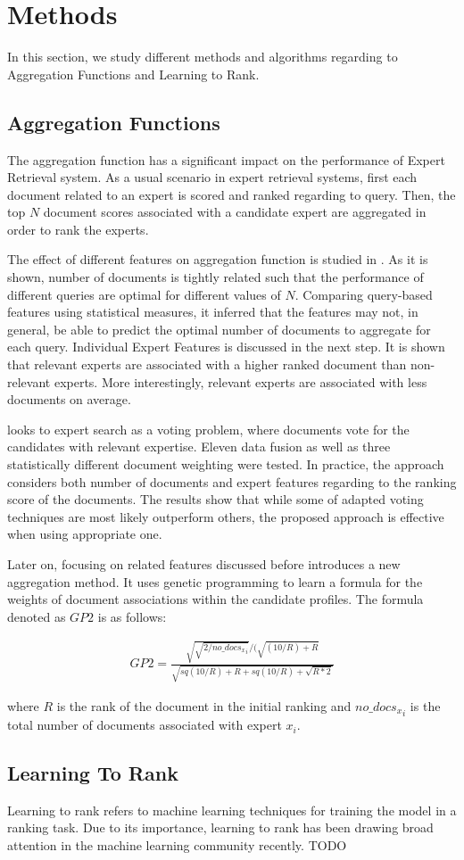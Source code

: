 \section{Methods}
\label{sec:methods}
In this section, we study different methods and algorithms regarding to Aggregation Functions and Learning to Rank.

\subsection{Aggregation Functions}
The aggregation function has a significant impact on the performance of Expert Retrieval system. As a usual scenario in expert retrieval systems, first each document related to an expert is scored and ranked regarding to query. Then, the top $N$ document scores associated with a candidate expert are aggregated in order to rank the experts. 

The effect of different features on aggregation function is studied in \citet{agg-gp2}. As it is shown, number of documents is tightly related such that the performance of different queries are optimal for different values of $N$. Comparing query-based features using statistical measures, it inferred that the features may not, in general, be able to predict the optimal number of documents to aggregate for each query. Individual Expert Features is discussed in the next step. It is shown that relevant experts are associated with a higher ranked document than non-relevant experts. More interestingly, relevant experts are associated with less documents on average.

\citet{agg-vote} looks to expert search as a voting problem, where documents vote for the candidates with relevant expertise. Eleven data fusion as well as three statistically different document weighting were tested. In practice, the approach considers both number of documents and expert features regarding to the ranking score of the documents. The results show that while some of adapted voting techniques are most likely outperform others, the proposed approach is effective when using appropriate one.

Later on, focusing on related features discussed before \citet{agg-gp2} introduces a new aggregation method. It uses genetic programming to learn a formula for the weights of document associations within the candidate profiles. The formula denoted as $GP2$ is as follows:

\begin{align*}
GP2 = \frac{\sqrt{\sqrt{2/{no\_docs_x}_i}}/(\sqrt{(10/R)+R}}{\sqrt{sq(10/R)+R+sq(10/R)+\sqrt{R*2}}}
\end{align*}

\noindent 
where $R$ is the rank of the document in the initial ranking and ${no\_docs_x}_i$ is the total number of documents associated with expert $x_i$.

\subsection{Learning To Rank}
Learning to rank refers to machine learning techniques for training the model in a ranking task. Due to its importance, learning to rank has been drawing broad attention in the machine learning community recently. 
TODO